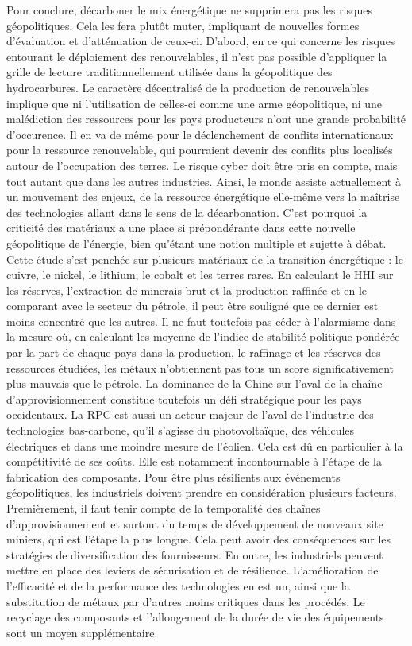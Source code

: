 Pour conclure, décarboner le mix énergétique ne supprimera pas les risques géopolitiques. Cela les fera plutôt muter, impliquant de nouvelles formes d'évaluation et d'atténuation de ceux-ci.
\smallbreak
D'abord, en ce qui concerne les risques entourant le déploiement des renouvelables, il n'est pas possible d'appliquer la grille de lecture traditionnellement utilisée dans la géopolitique des hydrocarbures. Le caractère décentralisé de la production de renouvelables implique que ni l'utilisation de celles-ci comme une arme géopolitique, ni une malédiction des ressources pour les pays producteurs n'ont une grande probabilité d'occurence. Il en va de même pour le déclenchement de conflits internationaux pour la ressource renouvelable, qui pourraient devenir des conflits plus localisés autour de l'occupation des terres. Le risque cyber doit être pris en compte, mais tout autant que dans les autres industries.
\smallbreak
Ainsi, le monde assiste actuellement à un mouvement des enjeux, de la ressource énergétique elle-même vers la maîtrise des technologies allant dans le sens de la décarbonation. C'est pourquoi la criticité des matériaux a une place si prépondérante dans cette nouvelle géopolitique de l'énergie, bien qu'étant une notion multiple et sujette à débat. Cette étude s'est penchée sur plusieurs matériaux de la transition énergétique : le cuivre, le nickel, le lithium, le cobalt et les terres rares. En calculant le HHI sur les réserves, l'extraction de minerais brut et la production raffinée et en le comparant avec le secteur du pétrole, il peut être souligné que ce dernier est moins concentré que les autres. Il ne faut toutefois pas céder à l'alarmisme dans la mesure où, en calculant les moyenne de l’indice de stabilité politique pondérée par la part de chaque pays dans la production, le raffinage et les réserves des ressources étudiées, les métaux n'obtiennent pas tous un score significativement plus mauvais que le pétrole. La dominance de la Chine sur l'aval de la chaîne d'approvisionnement constitue toutefois un défi stratégique pour les pays occidentaux. 
\smallbreak
La RPC est aussi un acteur majeur de l'aval de l'industrie des technologies bas-carbone, qu'il s'agisse du photovoltaïque, des véhicules électriques et dans une moindre mesure de l'éolien. Cela est dû en particulier à la compétitivité de ses coûts. Elle est notamment incontournable à l'étape de la fabrication des composants. Pour être plus résilients aux événements géopolitiques, les industriels doivent prendre en considération plusieurs facteurs. Premièrement, il faut tenir compte de la temporalité des chaînes d'approvisionnement et surtout du temps de développement de nouveaux site miniers, qui est l'étape la plus longue. Cela peut avoir des conséquences sur les stratégies de diversification des fournisseurs. En outre, les industriels peuvent mettre en place des leviers de sécurisation et de résilience. L'amélioration de l'efficacité et de la performance des technologies en est un, ainsi que la substitution de métaux par d'autres moins critiques dans les procédés. Le recyclage des composants et l'allongement de la durée de vie des équipements sont un moyen supplémentaire.
